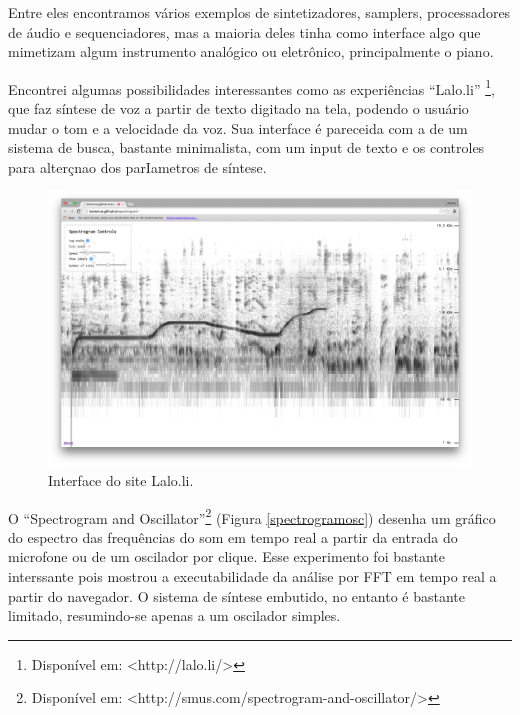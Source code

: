 Entre eles encontramos vários exemplos de sintetizadores, samplers, processadores de áudio e sequenciadores, mas a maioria deles tinha como interface algo que mimetizam algum instrumento analógico ou eletrônico, principalmente o piano.

Encontrei algumas possibilidades interessantes como as experiências ``Lalo.li'' \footnote{Disponível em: <http://lalo.li/> }, que faz síntese de voz a partir de texto digitado na tela, podendo o usuário mudar o tom e a velocidade da voz. Sua interface é pareceida com a de um sistema de busca, bastante minimalista, com um input de texto e os controles para alterçnao dos parIametros de síntese.

\begin{figure}[ht]
    \caption{\label{laloli}Interface do site Lalo.li.}
    \begin{center}
        \includegraphics[width=1\linewidth]{pictures/cap2/spectrogramandoscilator}
    \end{center}
\end{figure}

O ``Spectrogram and Oscillator''\footnote{Disponível em: <http://smus.com/spectrogram-and-oscillator/>} (Figura \ref{spectrogramosc}) desenha um gráfico do espectro das frequências do som em tempo real a partir da entrada do microfone ou de um oscilador por clique. Esse experimento foi bastante interssante pois mostrou a executabilidade da análise por FFT em tempo real a partir do navegador. O sistema de síntese embutido, no entanto é bastante limitado, resumindo-se apenas a um oscilador simples.   




